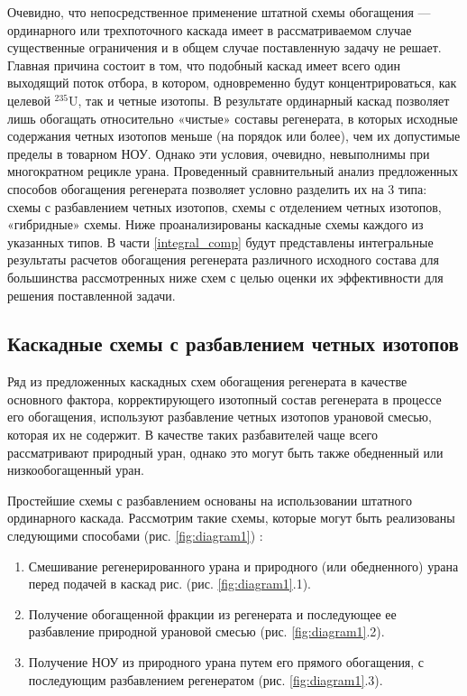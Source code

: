 Очевидно, что непосредственное применение штатной схемы обогащения --- ординарного или трехпоточного каскада имеет в рассматриваемом случае существенные ограничения и в общем случае поставленную задачу не решает. Главная причина состоит в том, что подобный каскад имеет всего один выходящий поток отбора, в котором, одновременно будут концентрироваться, как целевой  $^{235}$U, так и четные изотопы. В результате ординарный каскад позволяет лишь обогащать относительно «чистые» составы регенерата, в которых исходные содержания четных изотопов меньше (на порядок или более), чем их допустимые пределы в товарном НОУ. Однако эти условия, очевидно, невыполнимы при многократном рецикле урана.
Проведенный сравнительный анализ предложенных способов обогащения регенерата позволяет условно разделить их на 3 типа: схемы с разбавлением четных изотопов,  схемы с отделением четных изотопов, «гибридные» схемы. 
Ниже проанализированы каскадные схемы каждого из указанных типов. В части \ref{integral_comp} будут представлены интегральные результаты расчетов обогащения регенерата различного исходного состава для большинства рассмотренных ниже схем с целью оценки их эффективности для решения поставленной задачи.

\subsection{Каскадные схемы с разбавлением четных изотопов}

Ряд из предложенных каскадных схем обогащения регенерата в качестве основного фактора, корректирующего изотопный состав регенерата в процессе его обогащения, используют разбавление четных изотопов урановой смесью, которая их не содержит. В качестве таких разбавителей чаще всего рассматривают природный уран, однако это могут быть также обедненный или низкообогащенный уран.

Простейшие схемы с разбавлением основаны на использовании штатного ординарного каскада. Рассмотрим такие схемы, которые могут быть реализованы следующими способами (рис. \ref{fig:diagram1}) \cite{ksenof88,borodynyaIssledovanieProblemyVovlecheniya1989,sulaberidzeNekotoryhRazdelitelnyhProblemah2004,smirnovKaskadnyeShemyZadachah2012}:

\begin{enumerate}
  \item Смешивание регенерированного урана и природного (или обедненного) урана перед подачей в каскад рис. (рис. \ref{fig:diagram1}.1).
  \item Получение обогащенной фракции из регенерата и последующее ее разбавление природной урановой смесью (рис. \ref{fig:diagram1}.2).
  \item Получение НОУ из природного урана путем его прямого обогащения, с последующим разбавлением регенератом (рис. \ref{fig:diagram1}.3).
\end{enumerate}

